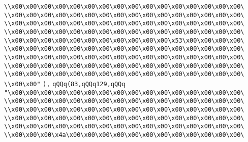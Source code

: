 \verb|\\x00\x00\x00\x00\x00\x00\x00\x00\x00\x00\x00\x00\x00\x00\x00\x00\|\newline
\verb|\\x00\x00\x00\x00\x00\x00\x00\x00\x00\x00\x00\x00\x00\x00\x00\x00\|\newline
\verb|\\x00\x00\x00\x00\x00\x00\x00\x00\x00\x00\x00\x00\x00\x00\x00\x00\|\newline
\verb|\\x00\x00\x00\x00\x00\x00\x00\x00\x00\x00\x00\x00\x00\x00\x00\x00\|\newline
\verb|\\x00\x00\x00\x00\x00\x00\x00\x00\x00\x00\x00\x53\x00\x00\x00\x00\|\newline
\verb|\\x00\x00\x00\x00\x00\x00\x00\x00\x00\x00\x00\x00\x00\x00\x00\x00\|\newline
\verb|\\x00\x00\x00\x00\x00\x00\x00\x00\x00\x00\x00\x00\x00\x00\x00\x00\|\newline
\verb|\\x00\x00\x00\x00\x00\x00\x00\x00\x00\x00\x00\x00\x00\x00\x00\x00\|\newline
\verb|\\x00\x00\x00\x00\x00\x00\x00\x00\x00\x00\x00\x00\x00\x00\x00\x00\|\newline
\verb|\\x00\x00"|\newline
\verb|),|\newline
\verb|qQQq(83,qQQq129,qQQq|\newline
\verb|"\x00\x00\x00\x00\x00\x00\x00\x00\x00\x00\x00\x00\x00\x00\x00\x00\|\newline
\verb|\\x00\x00\x00\x00\x00\x00\x00\x00\x00\x00\x00\x00\x00\x00\x00\x00\|\newline
\verb|\\x00\x00\x00\x00\x00\x00\x00\x00\x00\x00\x00\x00\x00\x00\x00\x00\|\newline
\verb|\\x00\x00\x00\x00\x00\x00\x00\x00\x00\x00\x00\x00\x00\x00\x00\x00\|\newline
\verb|\\x00\x00\x00\x00\x00\x00\x00\x00\x00\x00\x00\x00\x00\x00\x00\x00\|\newline
\verb|\\x00\x00\x00\x4a\x00\x00\x00\x00\x00\x00\x00\x00\x00\x00\x00\x00\|\newline
